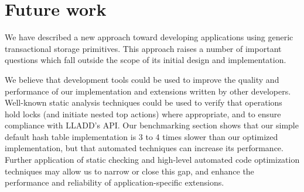 \documentclass[10pt,letterpaper,twocolumn,english]{article}
\newcommand{\yad}{LLADD\xspace}
\begin{document}


\section{Future work}

We have described a new approach toward developing applications using
generic transactional storage primitives.  This approach raises a
number of important questions which fall outside the scope of its
initial design and implementation.


We believe that development tools could be used to
improve the quality and performance of our implementation and
extensions written by other developers.  Well-known static analysis
techniques could be used to verify that operations hold locks (and
initiate nested top actions) where appropriate, and to ensure
compliance with \yad's API.  Our benchmarking section shows that our simple default
hash table implementation is 3 to 4 times slower than our optimized
implementation, but that automated techniques can increase its performance.
  Further application of static checking and high-level automated code
optimization techniques may allow us to narrow or close this
gap, and enhance the performance and reliability of application-specific 
extensions.
\end{document}
